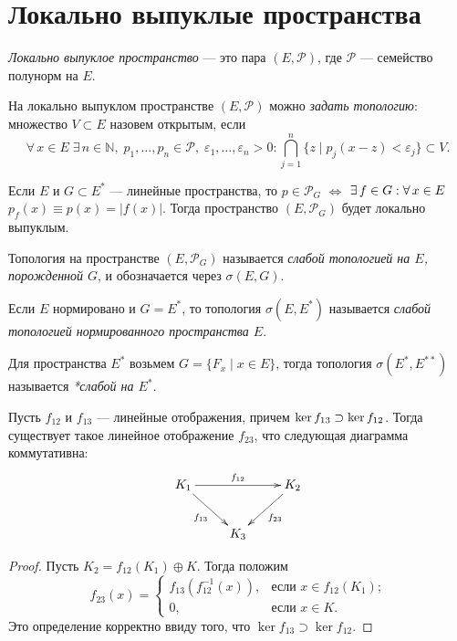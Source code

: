 \documentclass[10pt]{article}
\newcommand*{\p}[1]{#1\nobreak\discretionary{}{\hbox{$\mathsurround=0pt #1$}}{}}
\begin{document}
\section{Локально выпуклые пространства}

\begin{df}
\emph{Локально выпуклое пространство} --- это пара
$(E,\mathcal{P})$, где $\mathcal{P}$ --- семейство полунорм на $E$.
\end{df}

\begin{df}
На локально выпуклом пространстве $(E,\mathcal{P})$ можно
\emph{задать топологию}: множество $V\subset E$ назовем открытым,
если $$\forall\,x\in E\;\exists\,n\in\mathbb{N},\;
p_1,\ldots,p_n\in\mathcal{P},\;\varepsilon_1,\ldots,\varepsilon_n>0:\bigcap\limits_{
j=1}^n\{z\mid p_j(x-z)<\varepsilon_j\}\subset V.$$
\end{df}

Если $E$ и $G\subset E^*$ --- линейные пространства, то
$p\in\mathcal{P}_G$ $\Leftrightarrow$ $\exists\,f\p\in
G:\forall\,x\in E$\;\;$p_f(x)\equiv p(x)=|f(x)|$. Тогда пространство
$(E,\mathcal{P}_G)$ будет локально выпуклым.

\begin{df}
Топология на пространстве $(E,\mathcal{P}_G)$ называется
\emph{слабой топологией на $E$, порожденной $G$}, и обозначается
через $\sigma(E,G)$.

Если $E$ нормировано и $G=E^*$, то топология $\sigma(E,E^*)$
называется \emph{слабой топологией нормированного пространства $E$}.

Для пространства $E^*$ возьмем $G=\{F_x\mid x\in E\}$, тогда
топология $\sigma(E^*, E^{**})$ называется \emph{*слабой на $E^*$}.
\end{df}


\begin{lemma}\label{lemm.algebra}
Пусть $f_{12}$ и $f_{13}$ --- линейные отображения, причем $\ker
f_{13}\p\supset \ker f_{12}$. Тогда существует такое линейное
отображение $f_{23}$, что следующая диаграмма коммутативна:
$$\xymatrix{
K_1 \ar@{->}[dr]_{f_{13}} \ar@{->}[rr]^{f_{12}}&& K_2\ar@{->}[dl]^{f_{23}}\\
&K_3}$$
\end{lemma}

\begin{proof}
Пусть $K_2=f_{12}(K_1)\oplus K$. Тогда положим
$$f_{23}(x)=
\begin{cases}
f_{13}(f_{12}^{-1}(x)),&\text{если $x\in f_{12}(K_1)$;}\\
0,&\text{если $x\in K.$}
\end{cases}$$
Это определение корректно ввиду того, что $\ker f_{13}\supset
\ker f_{12}$.
\end{proof}
\end{document}
